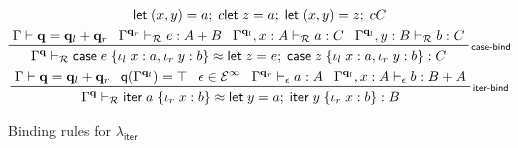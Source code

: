 \documentclass[acmsmall,screen,review]{acmart}
\newcommand{\mc}[1]{\ensuremath{\mathcal{#1}}}
\newcommand{\mb}[1]{\ensuremath{\mathbf{#1}}}
\newcommand{\ms}[1]{\ensuremath{\mathsf{#1}}}
\newcommand{\lto}{:}
\newcommand{\linl}[1]{\iota_l\;{#1}}
\newcommand{\linr}[1]{\iota_r\;{#1}}
\newcommand{\letexpr}[3]{\ensuremath{\ms{let}\;#1 = #2;\;#3}}
\newcommand{\caseexpr}[5]{\ms{case}\;#1\;\{\linl{#2} \lto #3, \linr{#4} \lto #5\}}
\newcommand{\liter}[3]{\ms{iter}\;#1\;\{ \linr{#2} \lto #3 \}}
\newcommand{\einf}[1]{#1 \in \mc{E}^\infty}
\newcommand{\qsp}[4]{#1 \vdash #2 = #3 + #4}
\newcommand{\rle}[1]{{\scriptsize\textsf{#1}}}
\newcommand{\hasty}[4]{#1 \vdash_{#2} #3: {#4}}
\newcommand{\teqv}{\approx}
\newcommand{\tmeq}[5]{#1 \vdash_{#2} #3 \teqv #4 : {#5}}
\newcommand{\subiterexp}{\(\lambda_{\ms{iter}}\)}
\newcommand{\alquant}{\ms{q}}
\begin{document}
\begin{figure}
\begin{gather*}
{          {\letexpr{(x, y)}{a}{c}}
          {\letexpr{z}{a}{\letexpr{(x, y)}{z}{c}}}
          {C}
      } \\
    \prftree[r]{\rle{case-bind}}
      {\qsp{\Gamma}{\mb{q}}{\mb{q}_l}{\mb{q}_r}}
      {\hasty{\Gamma^{\mb{q}_r}}{\mc{R}}{e}{A + B}}
      {\hasty{\Gamma^{\mb{q}_l}, x : A}{\mc{R}}{a}{C}}
      {\hasty{\Gamma^{\mb{q}_l}, y : B}{\mc{R}}{b}{C}}
      {
        \tmeq{\Gamma^{\mb{q}}}{\mc{R}}
        {\caseexpr{e}{x}{a}{y}{b}}
        {\letexpr{z}{e}{\caseexpr{z}{x}{a}{y}{b}}}
        {C}
      } \\
    \prftree[r]{\rle{iter-bind}}
      {\qsp{\Gamma}{\mb{q}}{\mb{q}_l}{\mb{q}_r}}
      {\alquant(\Gamma^{\mb{q}_l}) = \top}
      {\einf{\epsilon}}
      {\hasty{\Gamma^{\mb{q}_r}}{\epsilon}{a}{A}}
      {\hasty{\Gamma^{\mb{q}_l}, x : A}{\epsilon}{b}{B + A}}
      {\tmeq{\Gamma^{\mb{q}}}{\mc{R}}{\liter{a}{x}{b}}{\letexpr{y}{a}{\liter{y}{x}{b}}}{B}}
  \end{gather*}
  \caption{Binding rules for \subiterexp{}}
  \Description{}
  \label{fig:binding-rules}
\end{figure}
\end{document}
